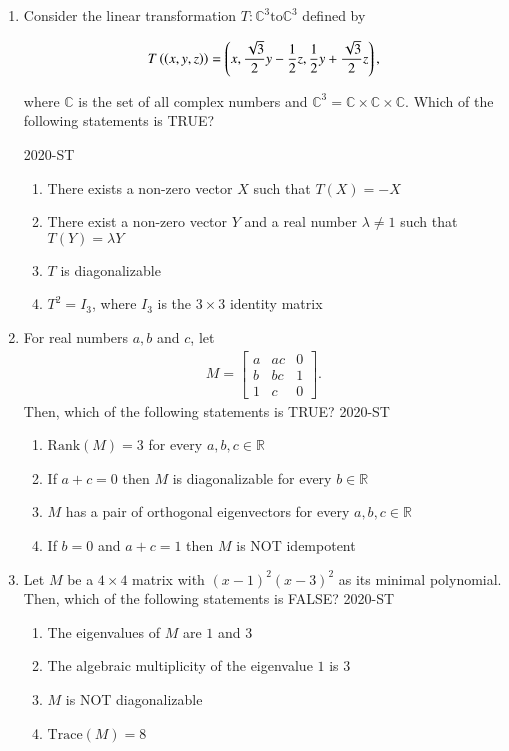 \documentclass[journal]{IEEEtran}
\begin{document}
\begin{enumerate}

\item Consider the linear transformation  $T : \mathbb{C}^3 \text{to}\mathbb{C}^3$  defined by

\begin{align*}
T\left(\left(x, y, z\right)\right) = \left( x, \frac{\sqrt{3}}{2} y - \frac{1}{2} z, \frac{1}{2} y + \frac{\sqrt{3}}{2} z \right),
\end{align*}

where  $\mathbb{C}$ is the set of all complex numbers and  $\mathbb{C}^3 = \mathbb{C} \times \mathbb{C} \times \mathbb{C} $. Which of the following statements is TRUE?

\hfill{2020-ST}

\begin{enumerate}
    \item There exists a non-zero vector  $X$ such that  $T(X) = -X$
    \item There exist a non-zero vector $Y $ and a real number  $\lambda \neq 1$ such that  $T(Y) = \lambda Y$
    \item  $T$ is diagonalizable
    \item  $T^2 = I_3$, where $I_3$ is the  $3 \times 3$ identity matrix
\end{enumerate}

\item For real numbers  $a, b$ and  $c$, let
\begin{align*}
M = \begin{bmatrix} a & ac & 0 \\ b & bc & 1 \\ 1 & c & 0 \end{bmatrix}.
\end{align*}
Then, which of the following statements is TRUE?
\hfill{2020-ST}
\begin{enumerate}
    \item  $\text{Rank}(M) = 3 $ for every  $a, b, c \in \mathbb{R}$
    \item If  $a + c = 0$ then  $M$ is diagonalizable for every  $b \in \mathbb{R}$
    \item  $M$ has a pair of orthogonal eigenvectors for every  $a, b, c \in \mathbb{R}$
    \item If  $b = 0$ and  $a + c = 1$ then  $M$ is NOT idempotent
\end{enumerate}

\item Let  $M$ be a  $4 \times 4$ matrix with  $(x - 1)^2(x - 3)^2$ as its minimal polynomial. Then, which of the following statements is FALSE?
\hfill{2020-ST}
\begin{enumerate}
    \item The eigenvalues of  $M$ are $1$ and $3$
    \item The algebraic multiplicity of the eigenvalue $1$ is $3$
    \item $M$ is NOT diagonalizable
    \item $\text{Trace}(M) = 8$
\end{enumerate}


\end{enumerate}
\end{document}
